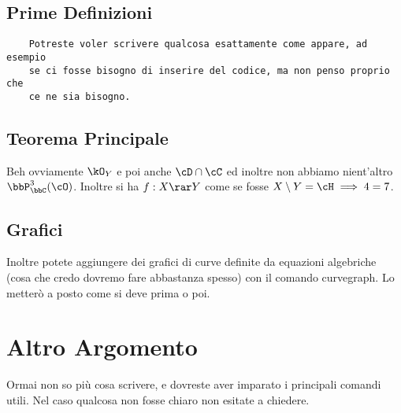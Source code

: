 \subsection{Prime Definizioni}
\begin{Verbatim}
    Potreste voler scrivere qualcosa esattamente come appare, ad esempio
    se ci fosse bisogno di inserire del codice, ma non penso proprio che
    ce ne sia bisogno.
\end{Verbatim}

\subsection{Teorema Principale}
Beh ovviamente $\kO_{Y}$ e poi anche $\cD \cap \cC$ ed inoltre non
abbiamo nient'altro $\bbP_\bbC^3 (\cO)$. Inoltre si ha $f: X \rar Y$
come se fosse $X \setminus Y = \cH \implies 4 = 7$.

\subsection{Grafici}
Inoltre potete aggiungere dei grafici di curve definite da equazioni
algebriche (cosa che credo dovremo fare abbastanza spesso) con il
comando curvegraph. Lo metterò a posto come si deve prima o poi.


\section{Altro Argomento}
Ormai non so più cosa scrivere, e dovreste aver imparato i principali comandi
utili. Nel caso qualcosa non fosse chiaro non esitate a chiedere.


